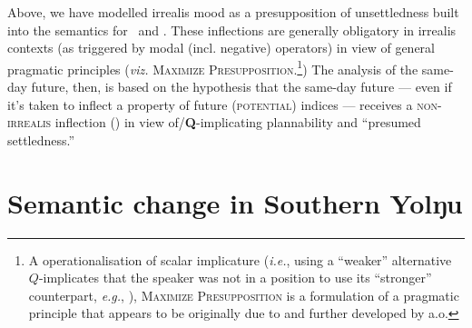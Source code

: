 Above, we have modelled irrealis mood as a presupposition of unsettledness built into the semantics for \II~and \IV. These inflections are generally obligatory in irrealis contexts (as triggered by modal (incl. negative) operators) in view of general pragmatic principles (\textit{viz.} \textsc{Maximize Presupposition.}\footnote{A operationalisation of scalar implicature (\textit{i.e.}, using a ``weaker'' alternative $ Q $-implicates that the speaker was not in a position to use its ``stronger'' counterpart,\textit{ e.g.}, \citealt{Horn1984}), \textsc{Maximize Presupposition} is a formulation of a pragmatic principle that appears to be originally due to \citet{Heim1991} and further developed by \citet{Sauerland2009,Percus2006} a.o.}) The analysis of the same-day future, then, is based on the hypothesis that the same-day future --- even if it's taken to inflect a property of future (\textsc{potential}) indices --- receives a \textsc{non-irrealis} inflection (\I{}) in view of/\textbf{Q}-implicating plannability and ``presumed settledness.'' 







\section{Semantic change in Southern Yolŋu}
\label{yol-change}

